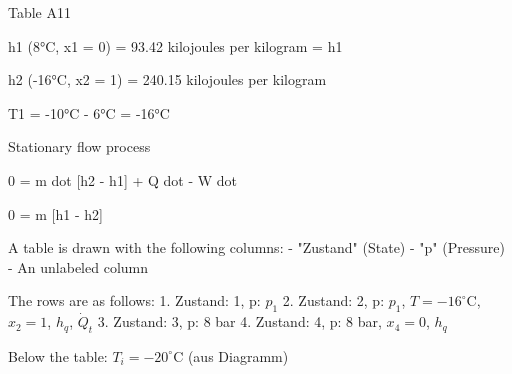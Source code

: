 Table A11  

h1 (8°C, x1 = 0) = 93.42 kilojoules per kilogram = h1  

h2 (-16°C, x2 = 1) = 240.15 kilojoules per kilogram  

T1 = -10°C - 6°C = -16°C  

Stationary flow process  

0 = m dot [h2 - h1] + Q dot - W dot  

0 = m [h1 - h2]

A table is drawn with the following columns:  
- "Zustand" (State)  
- "p" (Pressure)  
- An unlabeled column  

The rows are as follows:  
1. Zustand: 1, p: \( p_1 \)  
2. Zustand: 2, p: \( p_1 \), \( T = -16^\circ \text{C} \), \( x_2 = 1 \), \( h_q \), \( \dot{Q}_t \)  
3. Zustand: 3, p: 8 bar  
4. Zustand: 4, p: 8 bar, \( x_4 = 0 \), \( h_q \)  

Below the table:  
\( T_i = -20^\circ \text{C} \) (aus Diagramm)
